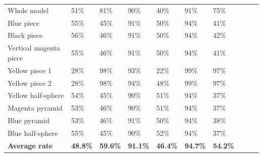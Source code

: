\documentclass[a4paper, 12pt]{book}
\begin{document}
\begin{table}[H]
\begin{tabular}{c|lllllllll}
\cline{1-7}
\multicolumn{1}{|l|}{Whole model}  & 
\multicolumn{1}{l|}{51\%}  &  
\multicolumn{1}{l|}{81\%}  & 
\multicolumn{1}{l|}{90\%}  & 
\multicolumn{1}{l|}{40\%}  & 
\multicolumn{1}{l|}{91\%}  & 
\multicolumn{1}{l|}{75\%}  &  \\ 
\cline{1-7}
\multicolumn{1}{|l|}{Blue piece}  &
\multicolumn{1}{l|}{55\%}  &
\multicolumn{1}{l|}{45\%}  & 
\multicolumn{1}{l|}{91\%} & 
\multicolumn{1}{l|}{50\%}  & 
\multicolumn{1}{l|}{94\%}  &  
\multicolumn{1}{l|}{41\%}  &   \\ 
\cline{1-7}
\multicolumn{1}{|l|}{Black piece}  & 
\multicolumn{1}{l|}{56\%}  & 
\multicolumn{1}{l|}{46\%}  & 
\multicolumn{1}{l|}{91\%} & 
\multicolumn{1}{l|}{50\%}  & 
\multicolumn{1}{l|}{94\%}  &
\multicolumn{1}{l|}{42\%}  &  \\ 
\cline{1-7}
\multicolumn{1}{|l|}{Vertical magenta piece}  & 
\multicolumn{1}{l|}{55\%}  & 
\multicolumn{1}{l|}{46\%}  & 
\multicolumn{1}{l|}{91\%} & 
\multicolumn{1}{l|}{50\%}  & 
\multicolumn{1}{l|}{94\%}  & 
\multicolumn{1}{l|}{41\%}  & \\ 
\cline{1-7}
\multicolumn{1}{|l|}{Yellow piece 1}  & 
\multicolumn{1}{l|}{28\%}  & 
\multicolumn{1}{l|}{98\%}  & 
\multicolumn{1}{l|}{93\%}  & 
\multicolumn{1}{l|}{22\%}  & 
\multicolumn{1}{l|}{99\%}  & 
\multicolumn{1}{l|}{97\%}  & \\ 
\cline{1-7}
\multicolumn{1}{|l|}{Yellow piece 2}  & 
\multicolumn{1}{l|}{28\%}  & 
\multicolumn{1}{l|}{98\%}  & 
\multicolumn{1}{l|}{94\%}  &  
\multicolumn{1}{l|}{48\%}  & 
\multicolumn{1}{l|}{99\%}  & 
\multicolumn{1}{l|}{97\%}  & \\ 
\cline{1-7}
\multicolumn{1}{|l|}{Yellow half-sphere}  & 
\multicolumn{1}{l|}{54\%}  & 
\multicolumn{1}{l|}{45\%}  & 
\multicolumn{1}{l|}{90\%}  &  
\multicolumn{1}{l|}{51\%}  & 
\multicolumn{1}{l|}{94\%}  & 
\multicolumn{1}{l|}{37\%}  & \\ 
\cline{1-7}
\multicolumn{1}{|l|}{Magenta pyramid}  & 
\multicolumn{1}{l|}{53\%}  & 
\multicolumn{1}{l|}{46\%}  & 
\multicolumn{1}{l|}{90\%}  &  
\multicolumn{1}{l|}{51\%}  & 
\multicolumn{1}{l|}{94\%}  & 
\multicolumn{1}{l|}{37\%}  & \\ 
\cline{1-7}
\multicolumn{1}{|l|}{Blue pyramid}  & 
\multicolumn{1}{l|}{53\%}  & 
\multicolumn{1}{l|}{46\%}  & 
\multicolumn{1}{l|}{91\%}  &  
\multicolumn{1}{l|}{50\%}  & 
\multicolumn{1}{l|}{94\%}  & 
\multicolumn{1}{l|}{38\%}  & \\ 
\cline{1-7}
\multicolumn{1}{|l|}{Blue  half-sphere}  & 
\multicolumn{1}{l|}{55\%}  & 
\multicolumn{1}{l|}{45\%}  & 
\multicolumn{1}{l|}{90\%}  &  
\multicolumn{1}{l|}{52\%}  & 
\multicolumn{1}{l|}{94\%}  & 
\multicolumn{1}{l|}{37\%}  & \\ 
\cline{1-7}
\multicolumn{1}{|l|}{\textbf{Average rate}} & 
\multicolumn{1}{l|}{\textbf{48.8\%}}  & 
\multicolumn{1}{l|}{\textbf{59.6\%}}  &  
\multicolumn{1}{l|}{\textbf{91.1\%}}  & 
\multicolumn{1}{l|}{\textbf{46.4\%}}  & 
\multicolumn{1}{l|}{\textbf{94.7\%}}  & 
\multicolumn{1}{l|}{\textbf{54.2\%}}  & \\ 
\cline{1-7}

\end{tabular}
\end{table}
\end{document}
